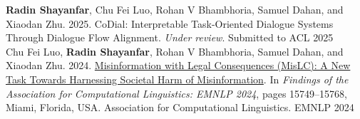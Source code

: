 
\begin{cvhonors}

  \cvpub
    {\textbf{Radin Shayanfar}, Chu Fei Luo, Rohan V Bhambhoria, Samuel Dahan, and Xiaodan Zhu. 2025. CoDial: Interpretable Task-Oriented Dialogue Systems Through Dialogue Flow Alignment. \textit{Under review}.} %
    {Submitted to ACL} %
    {2025} %
\\
  \cvpub
    {Chu Fei Luo, \textbf{Radin Shayanfar}, Rohan V Bhambhoria, Samuel Dahan, and Xiaodan Zhu. 2024. \href{https://aclanthology.org/2024.findings-emnlp.924/}{Misinformation with Legal Consequences (MisLC): A New Task Towards Harnessing Societal Harm of Misinformation}. In \textit{Findings of the Association for Computational Linguistics: EMNLP 2024}, pages 15749–15768, Miami, Florida, USA. Association for Computational Linguistics.} %
    {EMNLP} %
    {2024} %
\end{cvhonors}






